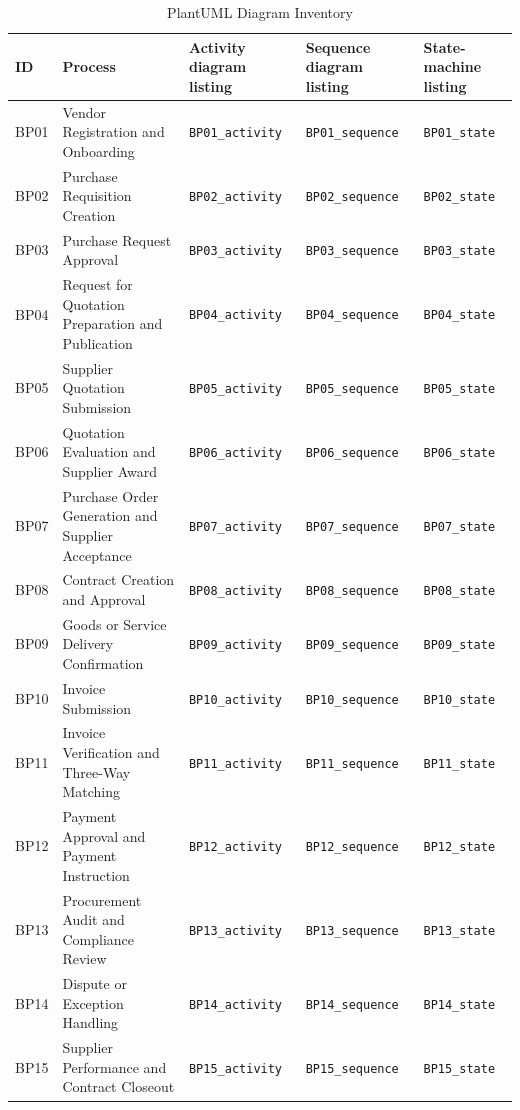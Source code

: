 \documentclass[conference]{IEEEtran}
\begin{document}
\begin{table}[!t]
\caption{PlantUML Diagram Inventory}
\label{tab:diagraminventory}
\scriptsize
\begin{tabularx}{\textwidth}{|L{0.8cm}|L{4.2cm}|Y|Y|Y|}
\hline
\textbf{ID} & \textbf{Process} & \textbf{Activity diagram listing} & \textbf{Sequence diagram listing} & \textbf{State-machine listing} \\ \hline
BP01 & Vendor Registration and Onboarding & \texttt{BP01\_activity} & \texttt{BP01\_sequence} & \texttt{BP01\_state} \\ \hline
BP02 & Purchase Requisition Creation & \texttt{BP02\_activity} & \texttt{BP02\_sequence} & \texttt{BP02\_state} \\ \hline
BP03 & Purchase Request Approval & \texttt{BP03\_activity} & \texttt{BP03\_sequence} & \texttt{BP03\_state} \\ \hline
BP04 & Request for Quotation Preparation and Publication & \texttt{BP04\_activity} & \texttt{BP04\_sequence} & \texttt{BP04\_state} \\ \hline
BP05 & Supplier Quotation Submission & \texttt{BP05\_activity} & \texttt{BP05\_sequence} & \texttt{BP05\_state} \\ \hline
BP06 & Quotation Evaluation and Supplier Award & \texttt{BP06\_activity} & \texttt{BP06\_sequence} & \texttt{BP06\_state} \\ \hline
BP07 & Purchase Order Generation and Supplier Acceptance & \texttt{BP07\_activity} & \texttt{BP07\_sequence} & \texttt{BP07\_state} \\ \hline
BP08 & Contract Creation and Approval & \texttt{BP08\_activity} & \texttt{BP08\_sequence} & \texttt{BP08\_state} \\ \hline
BP09 & Goods or Service Delivery Confirmation & \texttt{BP09\_activity} & \texttt{BP09\_sequence} & \texttt{BP09\_state} \\ \hline
BP10 & Invoice Submission & \texttt{BP10\_activity} & \texttt{BP10\_sequence} & \texttt{BP10\_state} \\ \hline
BP11 & Invoice Verification and Three-Way Matching & \texttt{BP11\_activity} & \texttt{BP11\_sequence} & \texttt{BP11\_state} \\ \hline
BP12 & Payment Approval and Payment Instruction & \texttt{BP12\_activity} & \texttt{BP12\_sequence} & \texttt{BP12\_state} \\ \hline
BP13 & Procurement Audit and Compliance Review & \texttt{BP13\_activity} & \texttt{BP13\_sequence} & \texttt{BP13\_state} \\ \hline
BP14 & Dispute or Exception Handling & \texttt{BP14\_activity} & \texttt{BP14\_sequence} & \texttt{BP14\_state} \\ \hline
BP15 & Supplier Performance and Contract Closeout & \texttt{BP15\_activity} & \texttt{BP15\_sequence} & \texttt{BP15\_state} \\ \hline
\end{tabularx}
\end{table}
\end{document}
